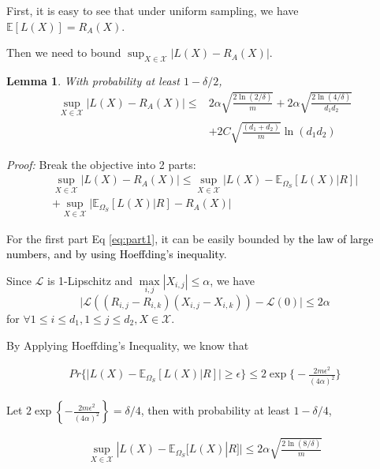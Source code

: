 \documentclass[conference]{IEEEtran}
\numberwithin{equation}{section}
\newcommand{\laks}[1]{\textcolor{black}{#1}}
\newcommand{\supX}{\sup_{X \in \mathcal{X}}}
\newcommand{\E}{\mathbb{E}}
\newtheorem{lemma}{Lemma}
\newtheorem{sampling strategy}{Sampling Strategy}
\begin{document}
First, it is easy to see that under uniform sampling, we have $\mathbb{E}[L(X)] = R_A(X)$. 

Then we need to bound $\sup_{X \in \mathcal{X} } |L(X) - R_A(X)| $.

\begin{lemma}
\label{lemma:bound}
    With probability at least $1 - \delta/2$, 
    \begin{equation}
    \begin{aligned}
        \supX |L(X) - R_A(X)| \leq & 2 \alpha \sqrt{\frac{2\ln(2/\delta)}{m}} + 2\alpha \sqrt{ \frac{2\ln(4/\delta) }{d_1 d_2} } \\
        & + 2 C \sqrt{\frac{(d_1 + d_2)}{m}} \ln(d_1 d_2)
    \end{aligned}
    \end{equation}
\end{lemma}

\emph{Proof:}
Break the objective into 2 parts: 
    \begin{align}
        \supX \Big|L(X) - R_A(X)\Big| \leq \supX \Big|L(X) - \mathbb{E}_{\Omega_S} [L(X) | R] \Big| \label{eq:part1}  \\ 
        + \supX \Big|\mathbb{E}_{\Omega_S} [L(X) | R] - R_A(X) \Big| \label{eq:part2}
    \end{align}

For the first part Eq \ref{eq:part1}, it can be easily bounded by \laks{the law of large numbers, and by using Hoeffding's inequality}.

Since $\mathcal{L}$ is 1-Lipschitz and $\underset{i,j}{\max} |X_{i,j}| \leq \alpha$, we have 
\[\Big|\mathcal{L}((R_{i,j} - R_{i,k})(X_{i,j} - X_{i,k})) - \mathcal{L}(0) \Big| \leq 2\alpha \] 
for $\forall 1 \leq i \leq d_1, 1 \leq j \leq d_2,  X \in \mathcal{X}$.

By Applying Hoeffding's Inequality, we know that

\begin{align}
    Pr\Big\{ \big|L(X) - \E_{\Omega_S}[ L(X) | R ]  \big| \geq \epsilon \Big\} \leq 2 \exp\Big\{-\frac{2m \epsilon^2}{(4\alpha)^2} \Big\} \nonumber
\end{align}

Let $2 \exp\left\{-\frac{2m \epsilon^2}{(4\alpha)^2} \right\} = \delta/4$, then with probability at least $1 - \delta/4$,

\begin{equation}
    \begin{aligned}
        \supX |L(X) - \mathbb{E}_{\Omega_S} [L(X) | R] | \leq 2 \alpha \sqrt{\frac{2\ln(8/\delta)}{m}}
        \label{eq:res_part1}
    \end{aligned}
\end{equation}
\end{document}
